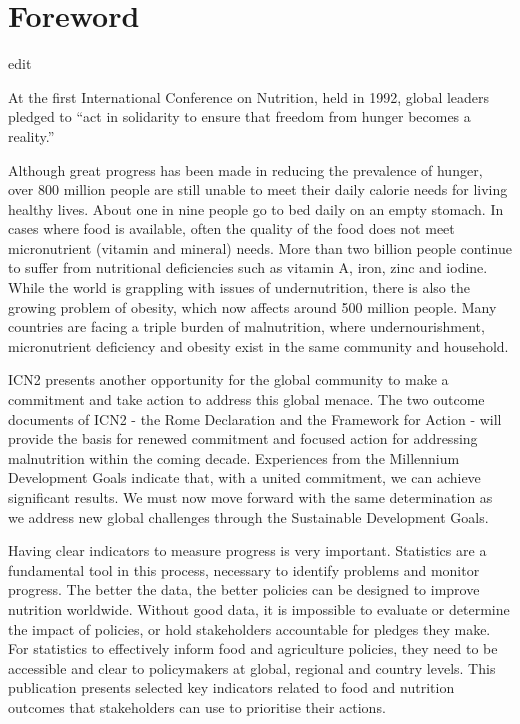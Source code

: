 \section{Foreword}

\bigskip
\bigskip

\large

edit

At the first International Conference on Nutrition, held in 1992, global leaders pledged to “act in solidarity to ensure that freedom from hunger becomes a reality.”

Although great progress has been made in reducing the prevalence of hunger, over 800 million people are still unable to meet their daily calorie needs for living healthy lives. About one in nine people go to bed daily on an empty stomach. In cases where food is available, often the quality of the food does not meet micronutrient (vitamin and mineral) needs. More than two billion people continue to suffer from nutritional deficiencies such as vitamin A, iron, zinc and iodine. While the world is grappling with issues of undernutrition, there is also the growing problem of obesity, which now affects around 500 million people. Many countries are facing a triple burden of malnutrition, where undernourishment, micronutrient deficiency and obesity exist in the same community and household. 

ICN2 presents another opportunity for the global community to make a commitment and take action to address this global menace. The two outcome documents of ICN2 - the Rome Declaration and the Framework for Action - will provide the basis for renewed commitment and focused action for addressing malnutrition within the coming decade. Experiences from the Millennium Development Goals indicate that, with a united commitment, we can achieve significant results. We must now move forward with the same determination as we address new global challenges through the Sustainable Development Goals.

Having clear indicators to measure progress is very important. Statistics are a fundamental tool in this process, necessary to identify problems and monitor progress. The better the data, the better policies can be designed to improve nutrition worldwide. Without good data, it is impossible to evaluate or determine the impact of policies, or hold stakeholders accountable for pledges they make. For statistics to effectively inform food and agriculture policies, they need to be accessible and clear to policymakers at global, regional and country levels. This publication presents selected key indicators related to food and nutrition outcomes that stakeholders can use to prioritise their actions.  


